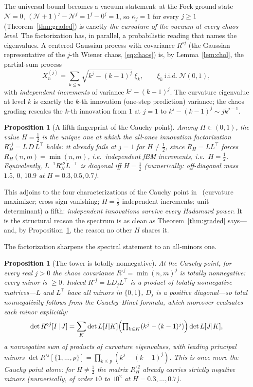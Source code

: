 \documentclass[11pt,reqno]{amsart}
\theoremstyle{plain}
\newtheorem{proposition}[theorem]{Proposition}
\theoremstyle{definition}
\theoremstyle{remark}
\newcommand{\Had}{\circ}
\begin{document}
The universal bound becomes a vacuum statement: at the Fock ground state
$\mathcal N=0$, $(\mathcal N+1)^j-\mathcal N^j=1^j-0^j=1$, so
$\kappa_j=1$ for every $j\ge1$ (Theorem~\ref{thm:graded}) is exactly
\emph{the curvature of the vacuum at every chaos level}. The
factorization has, in parallel, a probabilistic reading that names the
eigenvalues.
A centered Gaussian process with covariance $R^{\Had j}$ (the Gaussian
representative of the $j$-th Wiener chaos, \eqref{eq:chaos}) is, by
Lemma~\ref{lem:chol}, the partial-sum process
\[
   X^{(j)}_n=\sum_{k\le n}\sqrt{k^j-(k-1)^j}\;\xi_k,\qquad
   \xi_k\ \text{i.i.d.}\ \mathcal N(0,1),
\]
with \emph{independent increments} of variance $k^j-(k-1)^j$. The
curvature eigenvalue at level $k$ is exactly the $k$-th innovation
(one-step prediction) variance; the chaos grading rescales the $k$-th
innovation from $1$ at $j=1$ to $k^j-(k-1)^j\sim jk^{j-1}$.

\begin{proposition}[A fifth fingerprint of the Cauchy point]
\label{prop:fifth}
Among $H\in(0,1)$, the value $H=\tfrac12$ is the unique one at which the
all-ones innovation factorization $R_H^{\Had j}=L\,D\,L^{\top}$ holds: it
already fails at $j=1$ for $H\neq\tfrac12$, since $R_H=LL^{\top}$ forces
$R_H(n,m)=\min(n,m)$, i.e.\ independent fBM increments, i.e.\ $H=\tfrac12$.
Equivalently, $L^{-1}R_H^{\Had 2}L^{-\top}$ is diagonal iff $H=\tfrac12$
(numerically: off-diagonal mass $1.5,\,0,\,10.9$ at $H=0.3,0.5,0.7$).
\end{proposition}

This adjoins to the four characterizations of the Cauchy point
in~\cite{FontesBE} (curvature maximizer; cross-sign vanishing; $H=\tfrac12$
independent increments; unit determinant) a fifth: \emph{independent
innovations survive every Hadamard power}. It is the structural reason
the spectrum is as clean as Theorem~\ref{thm:graded} says---and, by
Proposition~\ref{prop:fifth}, the reason no other $H$ shares it.

The factorization sharpens the spectral statement to an all-minors one.

\begin{proposition}[The tower is totally nonnegative]\label{prop:TN}
At the Cauchy point, for every real $j>0$ the chaos covariance
$R^{\Had j}=\min(n,m)^j$ is \emph{totally nonnegative}: every minor is
$\ge0$. Indeed $R^{\Had j}=LD_jL^{\top}$ is a product of totally
nonnegative matrices---$L$ and $L^{\top}$ have all minors in $\{0,1\}$,
$D_j$ is a positive diagonal---so total nonnegativity follows from the
Cauchy--Binet formula, which moreover evaluates each minor explicitly:
\begin{equation}\label{eq:CB}
   \det R^{\Had j}[I\,|\,J]
   =\sum_{K}\det L[I|K]\Bigl(\textstyle\prod_{k\in K}(k^j-(k-1)^j)\Bigr)
     \det L[J|K],
\end{equation}
a nonnegative sum of products of curvature eigenvalues, with leading
principal minors $\det R^{\Had j}[\{1,\dots,p\}]=\prod_{k\le p}(k^j-(k-1)^j)$.
This is once more the Cauchy point alone: for $H\neq\tfrac12$ the matrix
$R_H^{\Had2}$ already carries strictly negative minors (numerically, of
order $10$ to $10^2$ at $H=0.3,\dots,0.7$).
\end{proposition}
\end{document}
